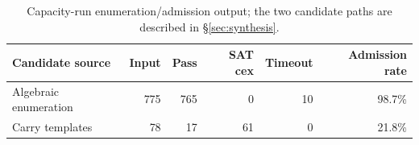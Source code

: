 \begin{table}[!h]
\centering
\caption{Capacity-run enumeration/admission output; the two candidate
paths are described in \S\ref{sec:synthesis}.}
\label{tab:synth-alive2}
\footnotesize
\begin{tabular}{@{}lrrrrr@{}}
\toprule
Candidate source & Input & Pass & SAT cex & Timeout & Admission rate \\
\midrule
Algebraic enumeration & 775 & 765 &  0 & 10 & 98.7\% \\
Carry templates       &  78 &  17 & 61 &  0 & 21.8\% \\
\bottomrule
\end{tabular}
\vspace{1pt}
\par{}
\end{table}

